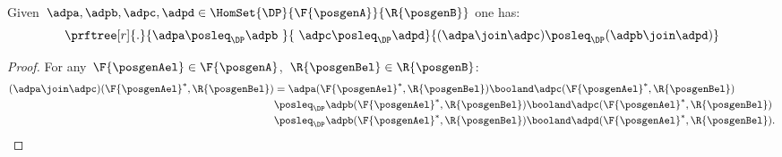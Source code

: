 \begin{lemma}
    \label{lem:intersection_mon}
    Given~$\adpa,\adpb,\adpc,\adpd \in \HomSet{\DP}{\F{\posgenA}}{\R{\posgenB}}$ one has:
    \begin{equation*}
        \prftree[r]{.}{\adpa\posleq_\DP \adpb\ }{\ \adpc\posleq_\DP \adpd}{(\adpa\join \adpc)\posleq_\DP (\adpb\join \adpd)}
    \end{equation*}
\end{lemma}
\begin{proof}
    For any~$\F{\posgenAel}\in \F{\posgenA}$,~$\R{\posgenBel}\in \R{\posgenB}$:
    \begin{equation*}
        \begin{aligned}
            (\adpa \join \adpc)(\F{\posgenAel}^*,\R{\posgenBel})
             & =\adpa(\F{\posgenAel}^*,\R{\posgenBel})\booland \adpc(\F{\posgenAel}^*,\R{\posgenBel})             \\
             & \posleq_\DP \adpb(\F{\posgenAel}^*,\R{\posgenBel})\booland \adpc(\F{\posgenAel}^*,\R{\posgenBel})  \\
             & \posleq_\DP \adpb(\F{\posgenAel}^*,\R{\posgenBel})\booland \adpd(\F{\posgenAel}^*,\R{\posgenBel}). 
        \end{aligned}
    \end{equation*}
\end{proof}